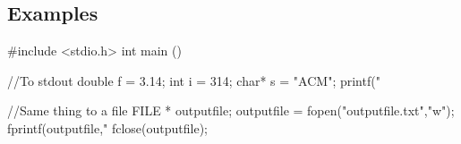 \subsection{Examples}
\begin{code}
    #include <stdio.h>
    int main (){
        //To stdout
        double f = 3.14;
        int    i = 314;
        char*  s = "ACM";
        printf("%

        //Same thing to a file
        FILE * outputfile;
        outputfile = fopen("outputfile.txt","w");
        fprintf(outputfile,"%
        fclose(outputfile);
    }
\end{code}

